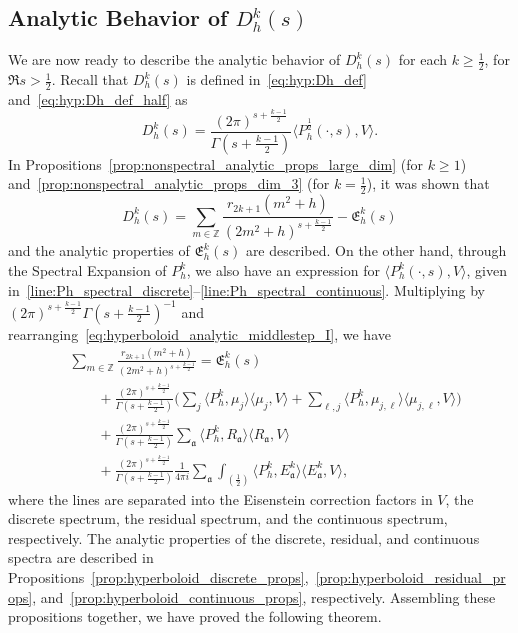\subsection{Analytic Behavior of $D_h^k(s)$}


We are now ready to describe the analytic behavior of $D_h^k(s)$ for each $k \geq
\frac{1}{2}$, for $\Re s > \frac{1}{2}$.
Recall that $D_h^k(s)$ is defined in~\eqref{eq:hyp:Dh_def} and~\eqref{eq:hyp:Dh_def_half}
as
\begin{equation}
  D_h^k(s) = \frac{(2\pi)^{s + \frac{k-1}{2}}}{\Gamma(s + \frac{k-1}{2})} \langle
  P_h^{\frac{1}{2}}(\cdot, s), V \rangle.
\end{equation}
In Propositions~\ref{prop:nonspectral_analytic_props_large_dim} (for $k \geq 1$)
and~\ref{prop:nonspectral_analytic_props_dim_3} (for $k = \frac{1}{2}$), it was shown that
\begin{equation}\label{eq:hyperboloid_analytic_middlestep_I}
  D_h^k(s) = \sum_{m \in \mathbb{Z}} \frac{r_{2k+1}(m^2 + h)}{(2m^2 + h)^{s +
  \frac{k-1}{2}}} - \mathfrak{E}_h^k(s)
\end{equation}
and the analytic properties of $\mathfrak{E}_h^k(s)$ are described.
On the other hand, through the Spectral Expansion of $P_h^k$, we also have an expression
for $\langle P_h^k(\cdot, s), V \rangle$, given
in~\eqref{line:Ph_spectral_discrete}--\eqref{line:Ph_spectral_continuous}.
Multiplying by $(2\pi)^{s + \frac{k-1}{2}} \Gamma(s + \frac{k-1}{2})^{-1}$ and
rearranging~\eqref{eq:hyperboloid_analytic_middlestep_I}, we have
\begin{equation}\label{eq:hyperboloid_dirichlet_decomposition}
  \begin{split}
    &\sum_{m \in \mathbb{Z}} \frac{r_{2k+1}(m^2 + h)}{(2m^2 + h)^{s + \frac{k-1}{2}}} =
    \mathfrak{E}_h^k(s) \\
    &\qquad + \frac{(2\pi)^{s + \frac{k-1}{2}}}{\Gamma(s + \frac{k-1}{2})} \bigg( \sum_j
  \langle P_h^k, \mu_j \rangle \langle \mu_j, V \rangle + \sum_{\ell,j} \langle P_h^k,
\mu_{j,\ell} \rangle \langle \mu_{j, \ell}, V \rangle \bigg) \\
    &\qquad + \frac{(2\pi)^{s + \frac{k-1}{2}}}{\Gamma(s + \frac{k-1}{2})}
\sum_\mathfrak{a} \langle P_h^k, R_\mathfrak{a}\rangle \langle R_\mathfrak{a}, V \rangle
\\
    &\qquad + \frac{(2\pi)^{s + \frac{k-1}{2}}}{\Gamma(s + \frac{k-1}{2})} \frac{1}{4\pi
i} \sum_{\mathfrak{a}} \int_{(\frac{1}{2})} \langle P_h^k, E_\mathfrak{a}^k\rangle \langle
E_\mathfrak{a}^k, V\rangle,
  \end{split}
\end{equation}
where the lines are separated into the Eisenstein correction factors in $V$, the discrete
spectrum, the residual spectrum, and the continuous spectrum, respectively.
The analytic properties of the discrete, residual, and continuous spectra are described in
Propositions~\ref{prop:hyperboloid_discrete_props},~\ref{prop:hyperboloid_residual_props},
and~\ref{prop:hyperboloid_continuous_props}, respectively.
Assembling these propositions together, we have proved the following theorem.


